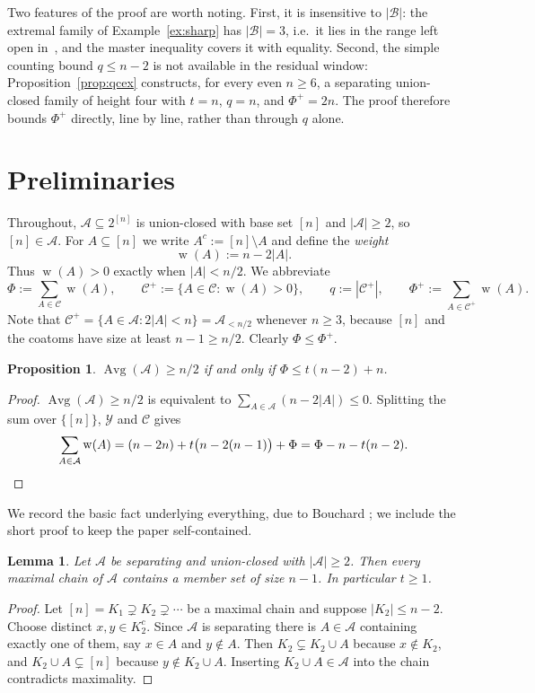 \documentclass[11pt,a4paper]{amsart}
\theoremstyle{plain}
\newtheorem{lemma}[theorem]{Lemma}
\newtheorem{proposition}[theorem]{Proposition}
\theoremstyle{definition}
\newcommand{\A}{\mathcal{A}}
\newcommand{\B}{\mathcal{B}}
\newcommand{\Cc}{\mathcal{C}}
\newcommand{\Yy}{\mathcal{Y}}
\newcommand{\Avg}{\operatorname{Avg}}
\newcommand{\Cp}{\Cc^{+}}
\DeclareMathOperator{\wt}{w}
\begin{document}
Two features of the proof are worth noting. First, it is insensitive to
$|\B|$: the extremal family of Example~\ref{ex:sharp} has $|\B|=3$, i.e.\ it lies
in the range left open in~\cite{Bouchard}, and the master inequality covers it
with equality. Second, the simple counting bound $q\le n-2$ is not available in
the residual window: Proposition~\ref{prop:qcex} constructs, for every even
$n\ge6$, a separating union-closed family of height four with $t=n$, $q=n$, and
$\Phi^+=2n$. The proof therefore bounds $\Phi^+$ directly, line by line, rather
than through $q$ alone.

\section{Preliminaries}\label{sec:prelim}

Throughout, $\A\subseteq2^{[n]}$ is union-closed with base set $[n]$ and
$|\A|\ge2$, so $[n]\in\A$. For $A\subseteq[n]$ we write $A^c:=[n]\setminus A$
and define the \emph{weight}
\[
  \wt(A):=n-2|A|.
\]
Thus $\wt(A)>0$ exactly when $|A|<n/2$. We abbreviate
\[
  \Phi:=\sum_{A\in\Cc}\wt(A),\qquad
  \Cp:=\{A\in\Cc:\wt(A)>0\},\qquad
  q:=|\Cp|,\qquad
  \Phi^+:=\sum_{A\in\Cp}\wt(A).
\]
Note that $\Cp=\{A\in\A:2|A|<n\}=\A_{<n/2}$ whenever $n\ge3$, because $[n]$ and
the coatoms have size at least $n-1\ge n/2$. Clearly $\Phi\le\Phi^+$.

\begin{proposition}\label{prop:reform}
$\Avg(\A)\ge n/2$ if and only if $\Phi\le t(n-2)+n$.
\end{proposition}

\begin{proof}
$\Avg(\A)\ge n/2$ is equivalent to $\sum_{A\in\A}(n-2|A|)\le0$. Splitting the sum
over $\{[n]\}$, $\Yy$ and $\Cc$ gives
\[
  \sum_{A\in\A}\wt(A)
  =(n-2n)+t\bigl(n-2(n-1)\bigr)+\Phi
  =\Phi-n-t(n-2). \qedhere
\]
\end{proof}

We record the basic fact underlying everything, due to Bouchard
\cite[Lem.~1.3]{Bouchard}; we include the short proof to keep the paper
self-contained.

\begin{lemma}\label{lem:coatom}
Let $\A$ be separating and union-closed with $|\A|\ge2$. Then every maximal chain
of $\A$ contains a member set of size $n-1$. In particular $t\ge1$.
\end{lemma}

\begin{proof}
Let $[n]=K_1\supsetneq K_2\supsetneq\cdots$ be a maximal chain and suppose
$|K_2|\le n-2$. Choose distinct $x,y\in K_2^c$. Since $\A$ is separating there
is $A\in\A$ containing exactly one of them, say $x\in A$ and $y\notin A$. Then
$K_2\subsetneq K_2\cup A$ because $x\notin K_2$, and $K_2\cup A\subsetneq[n]$
because $y\notin K_2\cup A$. Inserting $K_2\cup A\in\A$ into the chain
contradicts maximality.
\end{proof}
\end{document}
